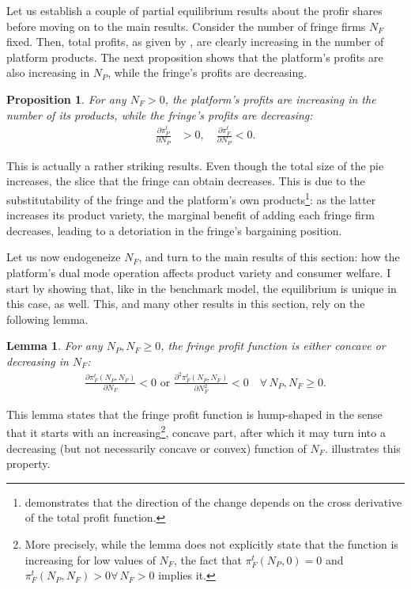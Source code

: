 \documentclass[a4paper]{article}
\newtheorem{proposition}{Proposition}
\newtheorem{lemma}{Lemma}
\begin{document}
Let us establish a couple of partial equilibrium results about the profir shares before moving on to the main results.
Consider the number of fringe firms $N_F$ fixed.
Then, total profits, as given by , are clearly increasing in the number of platform products.
The next proposition shows that the platform's profits are also increasing in $N_P$, while the fringe's profits are decreasing.
\begin{proposition}
    \label{prop:profits_partial_bargaining}
    For any $N_F > 0$, the platform's profits are increasing in the number of its products, while the fringe's profits are decreasing:
    \begin{align*}
        \frac{\partial \pi_P^t}{\partial N_P} &> 0, \quad \frac{\partial \pi_F^t}{\partial N_P} < 0.
    \end{align*}
\end{proposition}
This is actually a rather striking results.
Even though the total size of the pie increases, the slice that the fringe can obtain decreases.
This is due to the substitutability of the fringe and the platform's own products\footnote{
     demonstrates that the direction of the change depends on the cross derivative of the total profit function.
}: as the latter increases its product variety, the marginal benefit of adding each fringe firm decreases, leading to a detoriation in the fringe's bargaining position.

Let us now endogeneize $N_F$, and turn to the main results of this section: how the platform's dual mode operation affects product variety and consumer welfare.
I start by showing that, like in the benchmark model, the equilibrium is unique in this case, as well.
This, and many other results in this section, rely on the following lemma.
\begin{lemma}
    \label{lem:shape_of_fringe_profit}
    For any $N_P, N_F \geq 0$, the fringe profit function is either concave or decreasing in $N_F$:
    \begin{align*}
        \frac{\partial \pi_F^t(N_P, N_F)}{\partial N_F} < 0 \text{ or } \frac{\partial^2 \pi_F^t(N_P, N_F)}{\partial N_F^2} < 0 \quad \forall\, N_P, N_F \geq 0.
    \end{align*}
\end{lemma}
This lemma states that the fringe profit function is hump-shaped in the sense that it starts with an increasing\footnote{
    More precisely, while the lemma does not explicitly state that the function is increasing for low values of $N_F$, the fact that $\pi_F^t(N_P, 0) = 0$ and $\pi_F^t(N_P, N_F) > 0 \forall\, N_F > 0$ implies it.
}, concave part, after which it may turn into a decreasing (but not necessarily concave or convex) function of $N_F$.
 illustrates this property.
\end{document}
